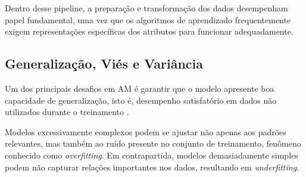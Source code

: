 Dentro desse pipeline, a preparação e transformação dos dados desempenham papel fundamental, 
uma vez que os algoritmos de aprendizado frequentemente exigem representações específicas dos atributos para funcionar adequadamente.

\subsection{Generalização, Viés e Variância}

Um dos principais desafios em AM é garantir que o modelo apresente boa capacidade de generalização, isto é, desempenho satisfatório em dados não 
utilizados durante o treinamento \cite{Goodfellow2016}. 

Modelos excessivamente complexos podem se ajustar não apenas aos padrões relevantes, mas também ao ruído presente no conjunto de treinamento, 
fenômeno conhecido como \textit{overfitting}. Em contrapartida, modelos demasiadamente simples podem não capturar relações importantes nos dados, 
resultando em \textit{underfitting}.

